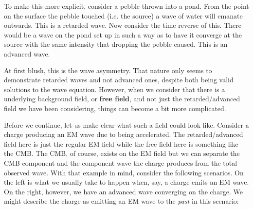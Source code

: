 \documentclass{article}
\begin{document}
To make this more explicit, consider a pebble thrown into a pond. From the point on the surface the pebble touched (i.e. the source) a wave of water will emanate outwards. This is a retarded wave. Now consider the time reverse of this. There would be a wave on the pond set up in such a way as to have it converge at the source with the same intensity that dropping the pebble caused. This is an advanced wave.

At first blush, this is the wave asymmetry. That nature only seems to demonstrate retarded waves and not advanced ones, despite both being valid solutions to the wave equation. However, when we consider that there is a underlying background field, or \textbf{free field}, and not just the retarded/advanced field we have been considering, things can become a bit more complicated.

Before we continue, let us make clear what such a field could look like. Consider a charge producing an EM wave due to being accelerated. The retarded/advanced field here is just the regular EM field while the free field here is something like the CMB. The CMB, of course, exists on the EM field but we can separate the CMB component and the component wave the charge produces from the total observed wave. With that example in mind, consider the following scenarios. On the left is what we usually take to happen when, say, a charge emits an EM wave. On the right, however, we have an advanced wave converging on the charge. We might describe the charge as emitting an EM wave to the \textit{past} in this scenario:
\newline 
{}
\end{document}
